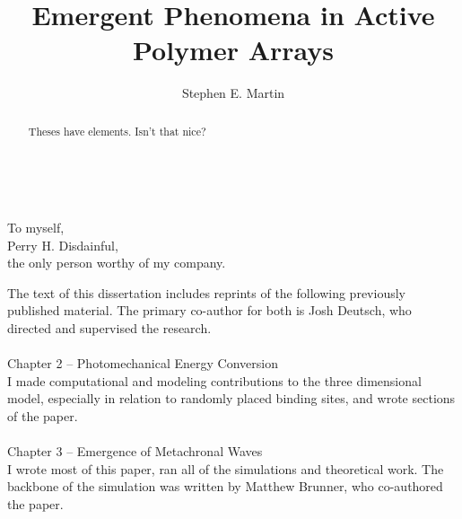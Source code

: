 \documentclass[11pt]{ucthesis}
\begin{document}

\title{Emergent Phenomena in Active Polymer Arrays}
\author{Stephen E. Martin}
\deanlinethree{}

\begin{frontmatter}

\maketitle
\newpage
\ \newpage
\tableofcontents
\listoffigures

\begin{abstract}
Theses have elements.  Isn't that nice?

\end{abstract}

\begin{dedication}
\null\vfil
{\large
\begin{center}
To myself,\\\vspace{12pt}
Perry H. Disdainful,\\\vspace{12pt}
the only person worthy of my company.
\end{center}}
\vfil\null
\end{dedication}


\begin{acknowledgements}
The text of this dissertation includes
reprints of the following previously published material. The primary co-author for both is Josh Deutsch, who directed and supervised the research.\\ \\
Chapter 2 -- Photomechanical Energy Conversion \cite{deutsch2015photomechanical}\\
I made computational and modeling contributions to the three dimensional model, especially in relation to randomly placed binding sites, and wrote sections of the paper.\\ \\
Chapter 3 -- Emergence of Metachronal Waves \cite{martin2018emergence}\\
I wrote most of this paper, ran all of the simulations and theoretical work. The backbone of the simulation was written by Matthew Brunner, who co-authored the paper. 
\end{acknowledgements}

\end{frontmatter}
\end{document}
